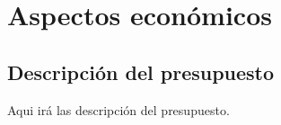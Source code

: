 
\chapter{Aspectos económicos} %

\label{Economia} %

\section{Descripción del presupuesto}

Aqui irá las descripción del presupuesto.
